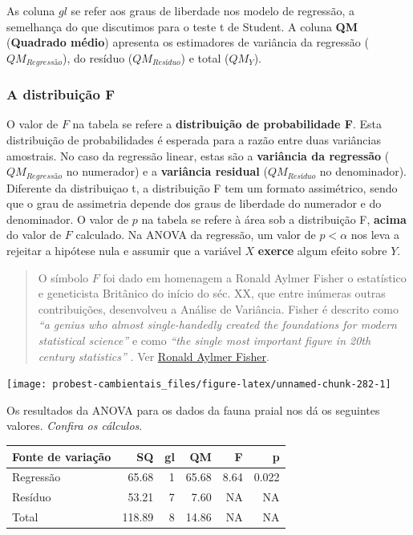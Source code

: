 \documentclass[
]{book}
\begin{document}
As coluna \(gl\) se refer aos graus de liberdade nos modelo de regressão, a semelhança do que discutimos para o teste t de Student. A coluna \textbf{QM} (\textbf{Quadrado médio}) apresenta os estimadores de variância da regressão (\(QM_{Regressão}\)), do resíduo (\(QM_{Resíduo}\)) e total (\(QM_{Y}\)).

\hypertarget{a-distribuiuxe7uxe3o-f}{%
\subsubsection{A distribuição F}\label{a-distribuiuxe7uxe3o-f}}

O valor de \(F\) na tabela se refere a \textbf{distribuição de probabilidade F}. Esta distribuição de probabilidades é esperada para a razão entre duas variâncias amostrais. No caso da regressão linear, estas são a \textbf{variância da regressão} (\(QM_{Regressão}\) no numerador) e a \textbf{variância residual} (\(QM_{Resíduo}\) no denominador). Diferente da distribuiçao t, a distribuição F tem um formato assimétrico, sendo que o grau de assimetria depende dos graus de liberdade do numerador e do denominador. O valor de \(p\) na tabela se refere à área sob a distribuição F, \textbf{acima} do valor de \(F\) calculado. Na ANOVA da regressão, um valor de \(p < \alpha\) nos leva a rejeitar a hipótese nula e assumir que a variável \(X\) \textbf{exerce} algum efeito sobre \(Y\).

\begin{quote}
O símbolo \(F\) foi dado em homenagem a Ronald Aylmer Fisher o estatístico e geneticista Britânico do início do séc. XX, que entre inúmeras outras contribuições, desenvolveu a Análise de Variância. Fisher é descrito como \emph{``a genius who almost single-handedly created the foundations for modern statistical science''} \citep{halt1998history} e como \emph{``the single most important figure in 20th century statistics''} \citep{efron1998r}. Ver \href{https://en.wikipedia.org/wiki/Ronald_Fisher}{Ronald Aylmer Fisher}.
\end{quote}

\begin{center}\texttt{[image: probest-cambientais\_files/figure-latex/unnamed-chunk-282-1]} \end{center}

Os resultados da ANOVA para os dados da fauna praial nos dá os seguintes valores. \emph{Confira os cálculos}.

\begin{tabular}{l|r|r|r|r|r}
\hline
Fonte de variação & SQ & gl & QM & F & p\\
\hline
Regressão & 65.68 & 1 & 65.68 & 8.64 & 0.022\\
\hline
Resíduo & 53.21 & 7 & 7.60 & NA & NA\\
\hline
Total & 118.89 & 8 & 14.86 & NA & NA\\
\hline
\end{tabular}
\end{document}
